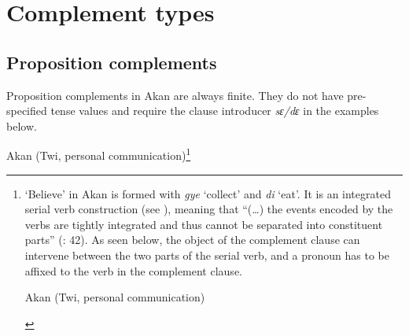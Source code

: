 \documentclass[output=paper]{langscibook}
\begin{document}
\section{Complement types}\label{Pajsect:3}

\subsection{Proposition complements}\label{Pajsect3.1}

Proposition complements in Akan are always finite. They do not have pre-spec\-i\-fied tense values and require the clause introducer \emph{sɛ/dɛ} in the examples below.

\begin{exe}
\ex \label{Paj11} Akan (Twi, personal communication)\footnote{%
‘Believe’ in Akan is formed with \emph{gye} ‘collect’ and \emph{di} ‘eat’. It is an integrated serial verb construction (see \citealt{osam2003}), meaning that “(…) the events encoded by the verbs are tightly integrated and thus cannot be separated into constituent parts” (\citealt{owusu2014}: 42). As seen below, the object of the complement clause can intervene between the two parts of the serial verb, and a pronoun has to be affixed to the verb in the complement clause. 

\begin{exe}
\ex \label{Paj1footnote} Akan (Twi, personal communication)
\begin{xlist}




\end{xlist}
\end{exe}}
\begin{xlist}


\end{xlist}
\end{exe}
\end{document}

